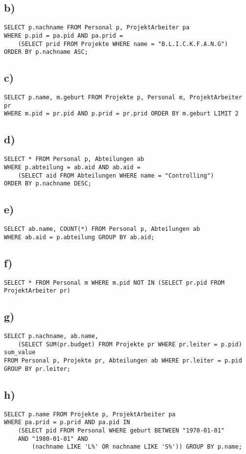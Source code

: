 \documentclass[a4paper,12pt,]{scrartcl}
\begin{document}
\subsection*{b)}
\begin{verbatim}
SELECT p.nachname FROM Personal p, ProjektArbeiter pa
WHERE p.pid = pa.pid AND pa.prid = 
    (SELECT prid FROM Projekte WHERE name = "B.L.I.C.K.F.A.N.G")
ORDER BY p.nachname ASC;
\end{verbatim}

\subsection*{c)}
\begin{verbatim}
SELECT p.name, m.geburt FROM Projekte p, Personal m, ProjektArbeiter pr
WHERE m.pid = pr.pid AND p.prid = pr.prid ORDER BY m.geburt LIMIT 2
\end{verbatim}

\subsection*{d)}
\begin{verbatim}
SELECT * FROM Personal p, Abteilungen ab
WHERE p.abteilung = ab.aid AND ab.aid =
    (SELECT aid FROM Abteilungen WHERE name = "Controlling")
ORDER BY p.nachname DESC;
\end{verbatim}

\subsection*{e)}
\begin{verbatim}
SELECT ab.name, COUNT(*) FROM Personal p, Abteilungen ab
WHERE ab.aid = p.abteilung GROUP BY ab.aid;
\end{verbatim}

\subsection*{f)}
\begin{verbatim}
SELECT * FROM Personal m WHERE m.pid NOT IN (SELECT pr.pid FROM ProjektArbeiter pr)
\end{verbatim}

\subsection*{g)}
\begin{verbatim}
SELECT p.nachname, ab.name,
    (SELECT SUM(pr.budget) FROM Projekte pr WHERE pr.leiter = p.pid) sum_value 
FROM Personal p, Projekte pr, Abteilungen ab WHERE pr.leiter = p.pid
GROUP BY pr.leiter;
\end{verbatim}

\subsection*{h)}
\begin{verbatim}
SELECT p.name FROM Projekte p, ProjektArbeiter pa
WHERE pa.prid = p.prid AND pa.pid IN
    (SELECT pid FROM Personal WHERE geburt BETWEEN "1970-01-01"
    AND "1980-01-01" AND
        (nachname LIKE 'L%' OR nachname LIKE 'S%')) GROUP BY p.name;
\end{verbatim}
\end{document}
